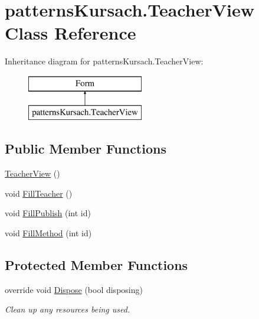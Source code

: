 \hypertarget{classpatterns_kursach_1_1_teacher_view}{}\section{patterns\+Kursach.\+Teacher\+View Class Reference}
\label{classpatterns_kursach_1_1_teacher_view}
Inheritance diagram for patterns\+Kursach.\+Teacher\+View\+:\begin{figure}[H]
\begin{center}
\leavevmode
\includegraphics[height=2.000000cm]{classpatterns_kursach_1_1_teacher_view}
\end{center}
\end{figure}
\subsection*{Public Member Functions}
\begin{DoxyCompactItemize}
\item 
\mbox{\hyperlink{classpatterns_kursach_1_1_teacher_view_a1096d03ed22a60d848473f3a10f01179}{Teacher\+View}} ()
\item 
void \mbox{\hyperlink{classpatterns_kursach_1_1_teacher_view_aa56a700da1d0c37ca75abe74eb466b92}{Fill\+Teacher}} ()
\item 
void \mbox{\hyperlink{classpatterns_kursach_1_1_teacher_view_a2ab40a41ea53ff51d414a0baa237ec4b}{Fill\+Publish}} (int id)
\item 
void \mbox{\hyperlink{classpatterns_kursach_1_1_teacher_view_a3a143c68f1bdb8540beb11f023a969dc}{Fill\+Method}} (int id)
\end{DoxyCompactItemize}
\subsection*{Protected Member Functions}
\begin{DoxyCompactItemize}
\item 
override void \mbox{\hyperlink{classpatterns_kursach_1_1_teacher_view_a3c824cb6726bdf46cdb2b3de0578d4d9}{Dispose}} (bool disposing)
\begin{DoxyCompactList}\small\item\em Clean up any resources being used. \end{DoxyCompactList}\end{DoxyCompactItemize}


